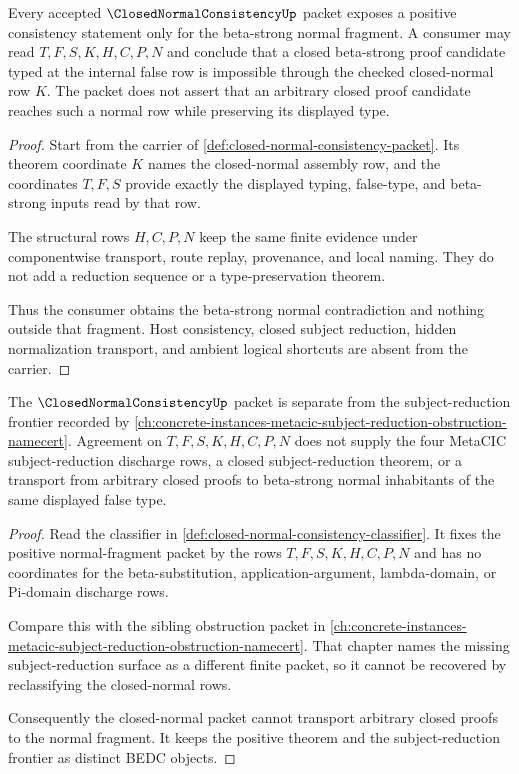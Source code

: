 \begin{theorem}
\label{thm:closed-normal-consistency-normal-fragment-boundary}
Every accepted $\ClosedNormalConsistencyUp$ packet exposes a positive consistency statement only for the beta-strong normal fragment. A consumer may read $T,F,S,K,H,C,P,N$ and conclude that a closed beta-strong proof candidate typed at the internal false row is impossible through the checked closed-normal row $K$. The packet does not assert that an arbitrary closed proof candidate reaches such a normal row while preserving its displayed type.
\end{theorem}
\begin{proof}
Start from the carrier of \autoref{def:closed-normal-consistency-packet}. Its theorem coordinate $K$ names the closed-normal assembly row, and the coordinates $T,F,S$ provide exactly the displayed typing, false-type, and beta-strong inputs read by that row.

The structural rows $H,C,P,N$ keep the same finite evidence under componentwise transport, route replay, provenance, and local naming. They do not add a reduction sequence or a type-preservation theorem.

Thus the consumer obtains the beta-strong normal contradiction and nothing outside that fragment. Host consistency, closed subject reduction, hidden normalization transport, and ambient logical shortcuts are absent from the carrier.
\end{proof}

\begin{theorem}
\label{thm:closed-normal-consistency-subject-reduction-frontier}
The $\ClosedNormalConsistencyUp$ packet is separate from the subject-reduction frontier recorded by \autoref{ch:concrete-instances-metacic-subject-reduction-obstruction-namecert}. Agreement on $T,F,S,K,H,C,P,N$ does not supply the four MetaCIC subject-reduction discharge rows, a closed subject-reduction theorem, or a transport from arbitrary closed proofs to beta-strong normal inhabitants of the same displayed false type.
\end{theorem}
\begin{proof}
Read the classifier in \autoref{def:closed-normal-consistency-classifier}. It fixes the positive normal-fragment packet by the rows $T,F,S,K,H,C,P,N$ and has no coordinates for the beta-substitution, application-argument, lambda-domain, or Pi-domain discharge rows.

Compare this with the sibling obstruction packet in \autoref{ch:concrete-instances-metacic-subject-reduction-obstruction-namecert}. That chapter names the missing subject-reduction surface as a different finite packet, so it cannot be recovered by reclassifying the closed-normal rows.

Consequently the closed-normal packet cannot transport arbitrary closed proofs to the normal fragment. It keeps the positive theorem and the subject-reduction frontier as distinct BEDC objects.
\end{proof}

